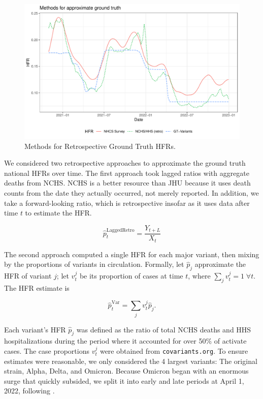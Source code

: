 \documentclass{article}
\renewcommand{\hat}{\widehat} %
\begin{document}
\begin{figure}
    \centering
    \includegraphics[width=0.8\linewidth]{Figs/Real/ApproxGT.pdf}
    \caption{Methods for Retrospective Ground Truth HFRs.}
    \label{fig:approxGT}
\end{figure}

We considered two retrospective approaches to approximate the ground truth national HFRs over time. The first approach took lagged ratios with aggregate deaths from NCHS. NCHS is a better resource than JHU because it uses death counts from the date they actually occurred, not merely reported. In addition, we take a forward-looking ratio, which is retrospective insofar as it uses data after time $t$ to estimate the HFR.

\begin{equation}\label{eq:LaggedRetro}
    \hat{p}_t^{\text{LaggedRetro}} = \frac{Y_{t+L}}{X_t}
\end{equation}

The second approach computed a single HFR for each major variant, then mixing by the proportions of variants in circulation. Formally, let $\hat{p}_j$ approximate the HFR of variant $j$; let $v_t^j$ be its proportion of cases at time $t$, where $\sum_j v_t^j = 1 \; \forall t$. The HFR estimate is

$$\hat{p}_t^{\text{Var}} = \sum_j v_t^j \hat{p}_j.$$

Each variant's HFR $\hat p_j$ was defined as the ratio of total NCHS deaths and HHS hospitalizations during the period where it accounted for over 50\% of activate cases. The case proportions $v_t^j$ were obtained from \texttt{covariants.org}. To ensure estimates were reasonable, we only considered the 4 largest variants: The original strain, Alpha, Delta, and Omicron. Because Omicron began with an enormous surge that quickly subsided, we split it into early and late periods at April 1, 2022, following \citep{adjei2022mortality}.
\end{document}
